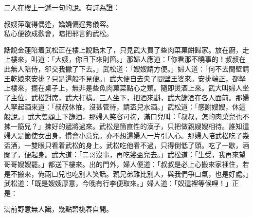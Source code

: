 二人在樓上一遞一句的說。有詩為證：

\begin{myquote}
叔嫂萍蹤得偶逢，嬌嬈偏逞秀儀容。\\
私心便欲成歡會，暗把邪言釣武松。
\end{myquote}

話說金蓮陪着武松正在樓上說話未了，只見武大買了些肉菜菓餅歸家。放在廚，走上樓來，叫道：「大嫂，你且下來則箇。」那婦人應道：「你看那不曉事的！叔叔在此無人陪侍，卻交我撇了下去。」{}武松道：「嫂嫂請方便。」婦人道：「何不去間壁請王乾娘來安排？{}只是這般不見便。」武大便自去央了間壁王婆來。安排端正，都拏上樓來，擺在桌子上，無非是些魚肉菓菜點心之類。隨即燙酒上來。武大叫婦人坐了主位，武松對席，武大打橫。三人坐下，把酒來斟，武大篩酒在各人面前。那婦人拏起酒來道：「叔叔休恠，沒甚管待，請盃兒水酒。」武松道：「感謝嫂嫂，休這般說。」武大隻顧上下篩酒，那婦人笑容可掬，滿口兒叫：「叔叔，怎的肉菓兒也不揀一筯兒？」{}揀好的遞將過來。武松是箇直性的漢子，只把做親嫂嫂相待。誰知這婦人是箇使女出身，慣會小意兒。亦不想這婦人一片引人心。那婦人陪武松吃了幾盃酒，一雙眼只看着武松的身上。武松吃他看不過，只得倒低了頭。{}吃了一歇，酒闌了，便起身。武大道：「二哥沒事，再吃幾盃兒去。」武松道：「生受，我再來望哥哥嫂嫂罷。」都送下樓來。出的門外，婦人便道：「叔叔是必上心搬來家裡住，若是不搬來，俺兩口兒也吃別人笑話。親兄弟難比別人，與我們爭口氣，也是好處。」{}武松道：「既是嫂嫂厚意，今晚有行李便取來。」婦人道：「奴這裡等候哩！」正是：

\begin{myquote}
滿前野意無人識，幾點碧桃春自開。
\end{myquote}

